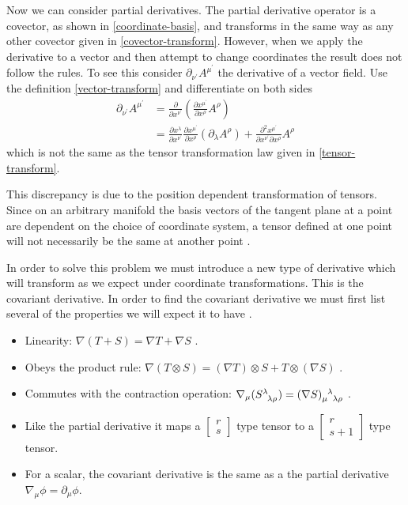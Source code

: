 Now we can consider partial derivatives. The partial derivative operator is a covector, as shown in \eqref{coordinate-basis}, and transforms in the same way as any other covector given in \eqref{covector-transform}. However, when we apply the derivative to a vector and then attempt to change coordinates the result does not follow the rules. To see this consider $\partial_{\nu^\prime} A^{\mu^\prime}$ the derivative of a vector field. Use the definition \eqref{vector-transform} and differentiate on both sides \cite{cheng}
\begin{equation} \label{partial-transform}
\begin{aligned}
	\partial_{\nu^\prime} A^{\mu^\prime} &= \frac{\partial}{\partial x^{\nu^\prime}} \left(\frac{\partial x^{\mu^\prime}}{\partial x^{\rho}} A^{\rho}\right) \\
	&= \frac{\partial x^{\lambda}}{\partial x^{\nu^\prime}} \frac{\partial x^{\mu^\prime}}{\partial x^{\rho}} (\partial_{\lambda} A^{\rho}) + \frac{\partial^2 x^{\mu^\prime}}{\partial x^{\nu^\prime} \partial x^{\rho}} A^{\rho}
\end{aligned}
\end{equation}
which is not the same as the tensor transformation law given in \eqref{tensor-transform}.

This discrepancy is due to the position dependent transformation of tensors. Since on an arbitrary manifold the basis vectors of the tangent plane at a point are dependent on the choice of coordinate system, a tensor defined at one point will not necessarily be the same at another point \cite{cheng}.

In order to solve this problem we must introduce a new type of derivative which will transform as we expect under coordinate transformations. This is the covariant derivative. In order to find the covariant derivative we must first list several of the properties we will expect it to have \cite{carroll}.

\begin{itemize}
	\item Linearity: \(\nabla (T + S) = \nabla T + \nabla S\) .
	\item Obeys the product rule: \(\nabla (T \otimes S) = (\nabla T) \otimes S + T \otimes (\nabla S)\) .
	\item Commutes with the contraction operation: \(\nabla_{\mu} (S\indices{^\lambda_\lambda_\rho}) = (\nabla S)\indices{_\mu^\lambda_\lambda_\rho}\) .
	\item Like the partial derivative it maps a \( \left[ \begin{smallmatrix} r \\ s \end{smallmatrix} \right] \) type tensor to a \( \left[ \begin{smallmatrix} r \\ s+1 \end{smallmatrix} \right] \) type tensor.
	\item For a scalar, the covariant derivative is the same as a the partial derivative \(\nabla_{\mu} \phi = \partial_{\mu} \phi\).
\end{itemize}

